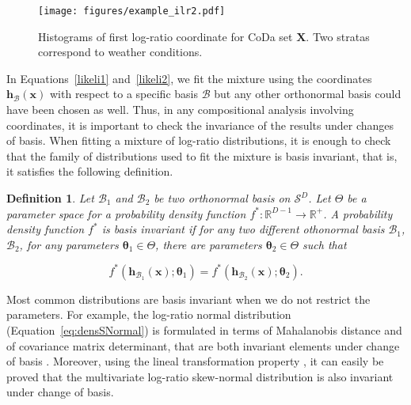 \documentclass[12pt, a4paper]{article}
\newcommand{\m}[1]{\boldsymbol{#1}}
\newtheorem{definition}{Definition}
\begin{document}
\begin{figure}[thbp]
\centering
\texttt{[image: figures/example\_ilr2.pdf]}
\caption{Histograms of first log-ratio coordinate for CoDa set $\mathbf{X}$. Two stratas correspond to weather conditions.}\label{example_ilr2}
\end{figure}
% 

In Equations~\ref{likeli1} and~\ref{likeli2}, we fit the mixture using the coordinates $\textbf{h}_\mathcal{B}(\textbf{x})$ with respect to a specific basis $\mathcal{B}$ but any other orthonormal basis could have been chosen as well. Thus, in any compositional analysis involving coordinates, it is important to check the invariance of the results under changes of basis. When fitting a mixture of log-ratio distributions, it is enough to check that the family of distributions used to fit the mixture is basis invariant, that is, it satisfies the following definition. 

\begin{definition}
Let $\mathcal{B}_1$ and $\mathcal{B}_2$ be two orthonormal basis on $\mathcal{S}^D$. Let $\Theta$ be a parameter space for a probability density function $f^*: \mathbb{R}^{D-1} \rightarrow \mathbb{R}^+$. 
A probability density function $f^*$ is \emph{basis invariant} if for any two different othonormal basis $\mathcal{B}_1$, $\mathcal{B}_2$, for any parameters $\m\theta_1 \in \Theta$, there are parameters $\m\theta_2 \in \Theta$ such that
\end{definition}
\vspace{-1.25cm}
$$
f^*(\textbf{h}_{\mathcal{B}_1}(\textbf{x}); \m\theta_1) = f^*(\textbf{h}_{\mathcal{B}_2}(\textbf{x}); \m\theta_2).
$$



Most common distributions are basis invariant when we do not restrict the parameters. For example, the log-ratio normal distribution (Equation~\ref{eq:densSNormal}) is formulated in terms of Mahalanobis distance and of covariance matrix determinant, that are both invariant elements under change of basis  \citep{barcelo1999comment}. Moreover,  using the lineal transformation property \citep{azzalini1999statistical}, it can easily be proved that the multivariate log-ratio skew-normal distribution is also invariant under change of basis. 
\end{document}
